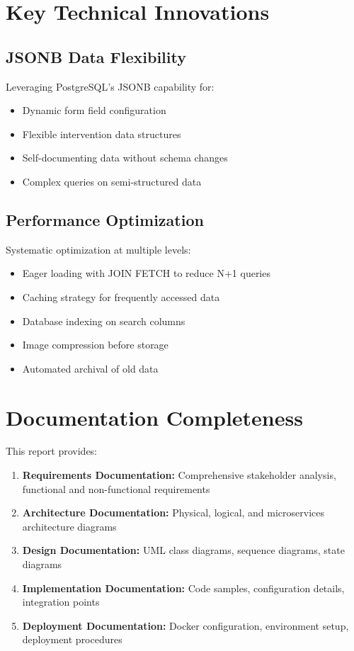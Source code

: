\section*{Key Technical Innovations}

\subsection*{JSONB Data Flexibility}

Leveraging PostgreSQL's JSONB capability for:
\begin{itemize}
\item Dynamic form field configuration
\item Flexible intervention data structures
\item Self-documenting data without schema changes
\item Complex queries on semi-structured data
\end{itemize}

\subsection*{Performance Optimization}

Systematic optimization at multiple levels:
\begin{itemize}
\item Eager loading with JOIN FETCH to reduce N+1 queries
\item Caching strategy for frequently accessed data
\item Database indexing on search columns
\item Image compression before storage
\item Automated archival of old data
\end{itemize}

\section*{Documentation Completeness}

This report provides:

\begin{enumerate}
\item \textbf{Requirements Documentation:} Comprehensive stakeholder analysis, functional and non-functional requirements
\item \textbf{Architecture Documentation:} Physical, logical, and microservices architecture diagrams
\item \textbf{Design Documentation:} UML class diagrams, sequence diagrams, state diagrams
\item \textbf{Implementation Documentation:} Code samples, configuration details, integration points
\item \textbf{Deployment Documentation:} Docker configuration, environment setup, deployment procedures
\end{enumerate}

